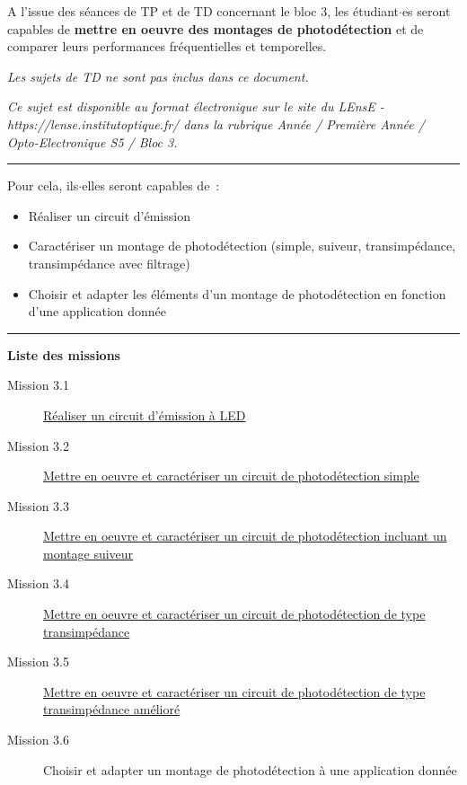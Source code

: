 \documentclass[a4paper,11pt]{article} %
\begin{document}
{\large A l'issue des séances de TP et de TD concernant le bloc 3, les étudiant$\cdot$es seront capables de \textbf{mettre en oeuvre des montages de
photodétection} et de comparer leurs performances fréquentielles et temporelles.

\medskip

\textit{Les sujets de TD ne sont pas inclus dans ce document.}

\medskip

\textit{Ce sujet est disponible au format électronique sur le site du LEnsE - https://lense.institutoptique.fr/ dans la rubrique Année / Première Année / Opto-Electronique S5 / Bloc 3.}

\noindent \rule{\linewidth}{1pt}

\medskip

Pour cela, ils$\cdot$elles %
seront capables de~:

\begin{itemize}
	\item Réaliser un circuit d'émission
	\item Caractériser un montage de photodétection (simple, suiveur, transimpédance, transimpédance avec filtrage)
	\item Choisir et adapter les éléments d'un montage de photodétection en fonction d'une application donnée
\end{itemize}


\noindent \rule{\linewidth}{1pt}

\medskip

\textbf{\large Liste des missions}

\begin{description}
	\item[Mission 3.1] \hyperref[mission31]{Réaliser un circuit d'émission à LED}
	\item[Mission 3.2] \hyperref[mission32]{Mettre en oeuvre et caractériser un circuit de photodétection simple}
	\item[Mission 3.3] \hyperref[mission33]{Mettre en oeuvre et caractériser un circuit de photodétection incluant un montage suiveur}
	\item[Mission 3.4] \hyperref[mission34]{Mettre en oeuvre et caractériser un circuit de photodétection de type transimpédance}
	\item[Mission 3.5] \hyperref[mission35]{Mettre en oeuvre et caractériser un circuit de photodétection de type transimpédance amélioré}
	\item[Mission 3.6] Choisir et adapter un montage de photodétection à une application donnée
\end{description}

}
\end{document}
